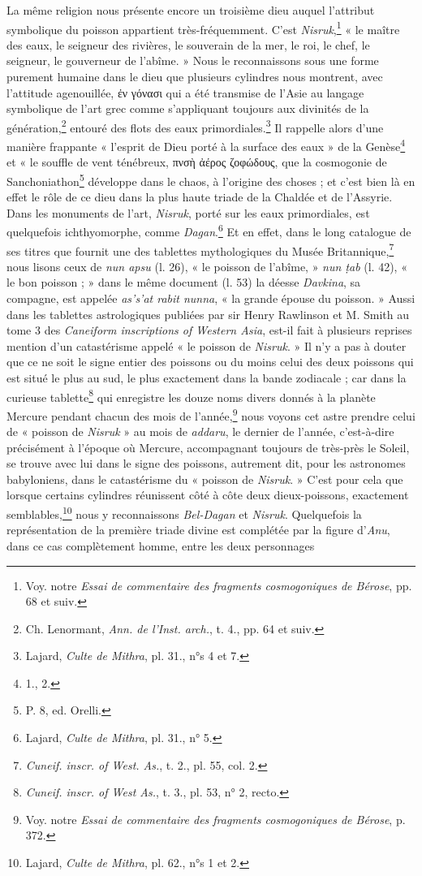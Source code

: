 \documentclass[a4paper, 11pt, oneside, landscape]{article}
\begin{document}
La même religion nous présente encore un troisième dieu auquel l'attribut symbolique du poisson appartient très-fréquemment. C'est \emph{Nisruk},\footnote{Voy. notre \emph{Essai de commentaire des fragments cosmogoniques de Bérose}, pp. 68 et suiv.} « le maître des eaux, le seigneur des rivières, le souverain de la mer, le roi, le chef, le seigneur, le gouverneur de l'abîme. » Nous le reconnaissons sous une forme purement humaine dans le dieu que plusieurs cylindres nous montrent, avec l'attitude agenouillée, ἐν γόνασι qui a été transmise de l'Asie au langage symbolique de l'art grec comme s'appliquant toujours aux divinités de la génération,\footnote{Ch. Lenormant, \emph{Ann. de l'Inst. arch.}, t. 4., pp. 64 et suiv.} entouré des flots des eaux primordiales.\footnote{Lajard, \emph{Culte de Mithra}, pl. 31., n°s 4 et 7.} Il rappelle alors d'une manière frappante « l'esprit de Dieu porté à la surface des eaux » de la Genèse\footnote{1., 2.} et « le souffle de vent ténébreux, πνσὴ ἀέρος ζοφώδους, que la cosmogonie de Sanchoniathon\footnote{P. 8, ed. Orelli.} développe dans le chaos, à l'origine des choses ; et c'est bien là en effet le rôle de ce dieu dans la plus haute triade de la Chaldée et de l'Assyrie. Dans les monuments de l'art, \emph{Nisruk}, porté sur les eaux primordiales, est quelquefois ichthyomorphe, comme \emph{Dagan}.\footnote{Lajard, \emph{Culte de Mithra}, pl. 31., n° 5.} Et en effet, dans le long catalogue de ses titres que fournit une des tablettes mythologiques du Musée Britannique,\footnote{\emph{Cuneif. inscr. of West. As.}, t. 2., pl. 55, col. 2.} nous lisons ceux de \emph{nun apsu} (l. 26), « le poisson de l'abîme, » \emph{nun ṭab} (l. 42), « le bon poisson ; » dans le même document (l. 53) la déesse \emph{Davkina}, sa compagne, est appelée \emph{as's'at rabit nunna}, « la grande épouse du poisson. » Aussi dans les tablettes astrologiques publiées par sir Henry Rawlinson et M. Smith au tome 3 des \emph{Caneiform inscriptions of Western Asia}, est-il fait à plusieurs reprises mention d'un catastérisme appelé « le poisson de \emph{Nisruk}. » Il n'y a pas à douter que ce ne soit le signe entier des poissons ou du moins celui des deux poissons qui est situé le plus au sud, le plus exactement dans la bande zodiacale ; car dans la curieuse tablette\footnote{\emph{Cuneif. inscr. of West As.}, t. 3., pl. 53, n° 2, recto.} qui enregistre les douze noms divers donnés à la planète Mercure pendant chacun des mois de l'année,\footnote{Voy. notre \emph{Essai de commentaire des fragments cosmogoniques de Bérose}, p. 372.} nous voyons cet astre prendre celui de « poisson de \emph{Nisruk} » au mois de \emph{addaru}, le dernier de l'année, c'est-à-dire précisément à l'époque où Mercure, accompagnant toujours de très-près le Soleil, se trouve avec lui dans le signe des poissons, autrement dit, pour les astronomes babyloniens, dans le catastérisme du « poisson de \emph{Nisruk}. » C'est pour cela que lorsque certains cylindres réunissent côté à côte deux dieux-poissons, exactement semblables,\footnote{Lajard, \emph{Culte de Mithra}, pl. 62., n°s 1 et 2.} nous y reconnaissons \emph{Bel-Dagan} et \emph{Nisruk}. Quelquefois la représentation de la première triade divine est complétée par la figure d'\emph{Anu}, dans ce cas complètement homme, entre les deux personnages 
\end{document}
